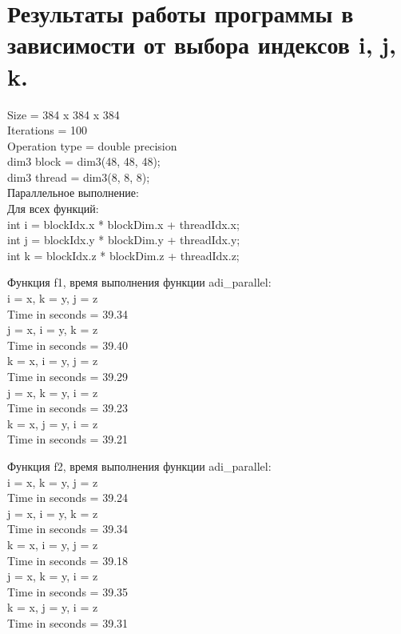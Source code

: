 \documentclass[a4paper,12pt,titlepage,draft]{article}
\begin{document}
\section{Результаты работы программы в зависимости от выбора индексов i, j, k.}
\begin{center}
    Size            =  384 x  384 x  384\\
    Iterations      =                100\\
    Operation type  =   double precision\\
    dim3 block = dim3(48, 48, 48);\\
    dim3 thread = dim3(8, 8, 8);\\
    Параллельное выполнение:\\

    Для всех функций:\\
    int i = blockIdx.x * blockDim.x + threadIdx.x;\\
    int j = blockIdx.y * blockDim.y + threadIdx.y;\\
    int k = blockIdx.z * blockDim.z + threadIdx.z;\\
\end{center}
\begin{minipage}{.45\textwidth}
    Функция f1, время выполнения функции adi\_parallel:\\

    i = x, k = y, j = z\\
    Time in seconds =             39.34\\
    j = x, i = y, k = z\\
    Time in seconds =             39.40\\
    k = x, i = y, j = z\\
    Time in seconds =             39.29\\
    j = x, k = y, i = z\\
    Time in seconds =             39.23\\
    k = x, j = y, i = z\\
    Time in seconds =             39.21\\
\end{minipage}
\hspace{1cm}
\begin{minipage}{.45\textwidth}
    Функция f2, время выполнения функции adi\_parallel:\\

    i = x, k = y, j = z\\
    Time in seconds =             39.24\\
    j = x, i = y, k = z\\
    Time in seconds =             39.34\\
    k = x, i = y, j = z\\
    Time in seconds =             39.18\\
    j = x, k = y, i = z\\
    Time in seconds =             39.35\\
    k = x, j = y, i = z\\
    Time in seconds =             39.31\\
\end{minipage}
\end{document}
